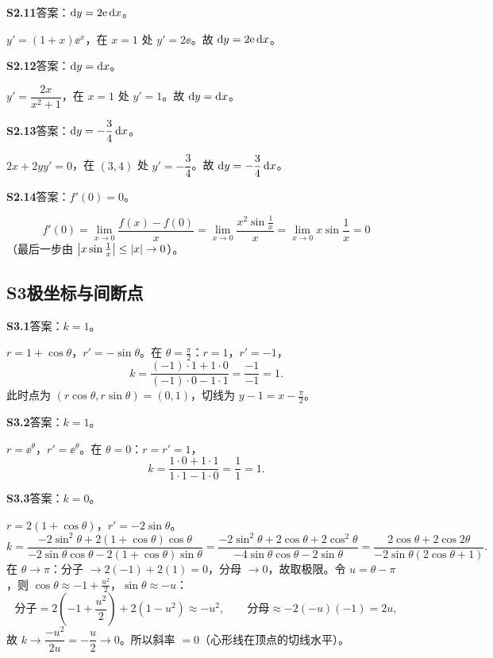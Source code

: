 \medskip
\noindent\textbf{S2.11}\quad 答案：$\mathrm{d} y=2\mathrm{e}\,\mathrm{d} x$。

$y'=(1+x)\ee^{x}$，在 $x=1$ 处 $y'=2\ee$。故 $\mathrm{d} y=2\mathrm{e}\,\mathrm{d} x$。

\medskip
\noindent\textbf{S2.12}\quad 答案：$\mathrm{d} y=\mathrm{d} x$。

$y'=\dfrac{2x}{x^{2}+1}$，在 $x=1$ 处 $y'=1$。故 $\mathrm{d} y=\mathrm{d} x$。

\medskip
\noindent\textbf{S2.13}\quad 答案：$\mathrm{d} y=-\dfrac{3}{4}\,\mathrm{d} x$。

$2x+2yy'=0$，在 $(3,4)$ 处 $y'=-\dfrac{3}{4}$。故 $\mathrm{d} y=-\dfrac{3}{4}\,\mathrm{d} x$。

\medskip
\noindent\textbf{S2.14}\quad 答案：$f'(0)=0$。

\[
f'(0)=\lim_{x\to0}\frac{f(x)-f(0)}{x}=\lim_{x\to0}\frac{x^{2}\sin\frac1x}{x}
=\lim_{x\to0}x\sin\frac1x=0
\]
（最后一步由 $\left\lvert x\sin\frac1x\right\rvert\leq\left\lvert x\right\rvert\to0$）。

\subsection{S3\quad 极坐标与间断点}

\noindent\textbf{S3.1}\quad 答案：$k=1$。

$r=1+\cos\theta$，$r'=-\sin\theta$。在 $\theta=\frac\pi2$：$r=1$，$r'=-1$，
\[
k=\frac{(-1)\cdot1+1\cdot0}{(-1)\cdot0-1\cdot1}=\frac{-1}{-1}=1.
\]
此时点为 $(r\cos\theta,r\sin\theta)=(0,1)$，切线为 $y-1=x-\frac\pi2$。

\medskip
\noindent\textbf{S3.2}\quad 答案：$k=1$。

$r=\ee^{\theta}$，$r'=\ee^{\theta}$。在 $\theta=0$：$r=r'=1$，
\[
k=\frac{1\cdot0+1\cdot1}{1\cdot1-1\cdot0}=\frac{1}{1}=1.
\]

\medskip
\noindent\textbf{S3.3}\quad 答案：$k=0$。

$r=2(1+\cos\theta)$，$r'=-2\sin\theta$。
\[
k=\frac{-2\sin^{2}\theta+2(1+\cos\theta)\cos\theta}{-2\sin\theta\cos\theta-2(1+\cos\theta)\sin\theta}
=\frac{-2\sin^{2}\theta+2\cos\theta+2\cos^{2}\theta}{-4\sin\theta\cos\theta-2\sin\theta}
=\frac{2\cos\theta+2\cos 2\theta}{-2\sin\theta(2\cos\theta+1)}.
\]
在 $\theta\to\pi$：分子 $\to2(-1)+2(1)=0$，分母 $\to0$，故取极限。令 $u=\theta-\pi$，则 $\cos\theta\approx-1+\frac{u^{2}}2$，$\sin\theta\approx-u$：
\[
\text{分子}=2\left(-1+\frac{u^{2}}2\right)+2\left(1-u^{2}\right)\approx -u^{2},\qquad
\text{分母}\approx-2(-u)(-1)=2u,
\]
故 $k\to\dfrac{-u^{2}}{2u}=-\dfrac{u}{2}\to0$。所以斜率 $=0$（心形线在顶点的切线水平）。

